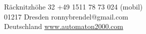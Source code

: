 {\Huge \name}
\vspace{0.5cm}

R\"acknitzh\"ohe 32 \hfill +49 1511 78 73 024 (mobil)\\
01217 Dresden \hfill ronnybrendel@gmail.com\\
Deutschland \hfill \href{http://www.automaton2000.com}{www.automaton2000.com}

\vspace{0.6cm}

